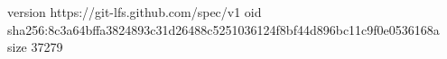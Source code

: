 version https://git-lfs.github.com/spec/v1
oid sha256:8c3a64bffa3824893c31d26488c5251036124f8bf44d896bc11c9f0e0536168a
size 37279
